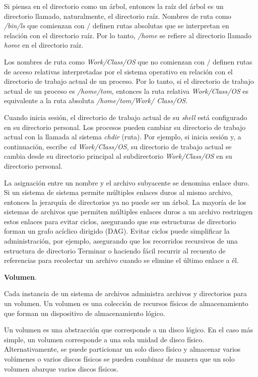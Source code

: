 \documentclass[10pt]{book}
\begin{document}
Si piensa en el directorio como un árbol, entonces la raíz del árbol es un directorio llamado, naturalmente, el directorio raíz. Nombres de ruta como \textit{/bin/ls} que comienzan con $/$ definen rutas absolutas que se interpretan en relación con el directorio raíz. Por lo tanto, \textit{/home} se refiere al directorio llamado \textit{home} en el directorio raíz.

Los nombres de ruta como \textit{Work/Class/OS} que no comienzan con $/$ definen rutas de acceso relativas interpretadas por el sistema operativo en relación con el directorio de trabajo actual de un proceso. Por lo tanto, si el directorio de trabajo actual de un proceso es \textit{/home/tom}, entonces la ruta relativa \textit{Work/Class/OS} es equivalente a la ruta absoluta \textit{/home/tom/Work/ Class/OS}.

Cuando inicia sesión, el directorio de trabajo actual de su \textit{shell} está configurado en su directorio personal. Los procesos pueden cambiar su directorio de trabajo actual con la llamada al sistema \textit{chdir} (ruta). Por ejemplo, si inicia sesión y, a continuación, escribe \textit{cd Work/Class/OS}, su directorio de trabajo actual se cambia desde su directorio principal al subdirectorio \textit{Work/Class/OS} en su directorio personal.

La asignación entre un nombre y el archivo subyacente se denomina enlace duro. Si un sistema de sistema permite múltiples enlaces duros al mismo archivo, entonces la jerarquía de directorios ya no puede ser un árbol. La mayoría de los sistemas de archivos que permiten múltiples enlaces duros a un archivo restringen estos enlaces para evitar ciclos, asegurando que sus estructuras de directorio forman un grafo acíclico dirigido (DAG). Evitar ciclos puede simplificar la administración, por ejemplo, asegurando que los recorridos recursivos de una estructura de directorio Terminar o haciendo fácil recurrir al recuento de referencias para recolectar un archivo cuando se elimine el último enlace a él.

\textbf{Volumen}. 

Cada instancia de un sistema de archivos administra archivos y directorios para un volumen. Un volumen es una colección de recursos físicos de almacenamiento que forman un dispositivo de almacenamiento lógico.

Un volumen es una abstracción que corresponde a un disco lógico. En el caso más simple, un volumen corresponde a una sola unidad de disco físico. Alternativamente, se puede particionar un solo disco físico y almacenar varios volúmenes o varios discos físicos se pueden combinar de manera que un solo volumen abarque varios discos físicos.
\end{document}
